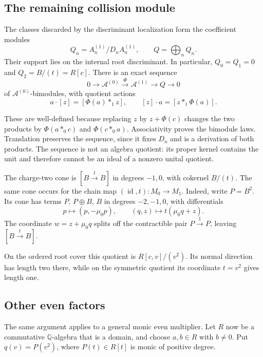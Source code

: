 \subsection{The remaining collision module}

The classes discarded by the discriminant localization form the
coefficient modules
\[
 Q_n=A_n^{(1)}/D_nA_n^{(1)},\qquad Q=\bigoplus_n Q_n.
\]
Their support lies on the internal root discriminant.
In particular, $Q_0=Q_1=0$ and $Q_2=B/(t)=R[c]$.
There is an exact sequence
\begin{equation}\label{cyspec:eq:relative-sequence}
 0\longrightarrow\mathcal A^{(0)}\xrightarrow{\Phi}\mathcal A^{(1)}
 \longrightarrow Q\longrightarrow0
\end{equation}
of $\mathcal A^{(0)}$-bimodules, with quotient actions
\begin{equation}\label{cyspec:eq:quotient-actions}
 a\cdot[z]=[\Phi(a)*_1z],\qquad [z]\cdot a=[z*_1\Phi(a)].
\end{equation}

These are well-defined because replacing $z$ by $z+\Phi(c)$ changes
the two products by $\Phi(a*_0c)$ and $\Phi(c*_0a)$.
Associativity proves the bimodule laws. Translation preserves the
sequence, since it fixes $D_n$ and is a derivation of both products.
The sequence is not an algebra quotient: its proper kernel contains
the unit and therefore cannot be an ideal of a nonzero unital quotient.

The charge-two cone is $[B\xrightarrow{t}B]$ in degrees $-1,0$,
with cokernel $B/(t)$. The same cone occurs for the chain map
$(\operatorname{id},t):M_0\to M_1$.
Indeed, write $P=B^2$. Its cone has terms $P$, $P\oplus B$, $B$
in degrees $-2,-1,0$, with differentials
\[
 p\longmapsto(p,-\mu_0p),\qquad
 (q,z)\longmapsto t(\mu_0q+z).
\]
The coordinate $w=z+\mu_0q$ splits off the contractible pair
$P\xrightarrow{1}P$, leaving $[B\xrightarrow{t}B]$.

On the ordered root cover this quotient is $R[c,v]/(v^2)$.
Its normal direction has length two there, while on the symmetric
quotient its coordinate $t=v^2$ gives length one.

\subsection{Other even factors}

The same argument applies to a general monic even multiplier.
Let $R$ now be a commutative $\mathbb Q$-algebra that is a domain,
and choose $a,b\in R$ with $b\ne0$.
Put $q(v)=P(v^2)$, where $P(t)\in R[t]$ is monic of positive degree.

